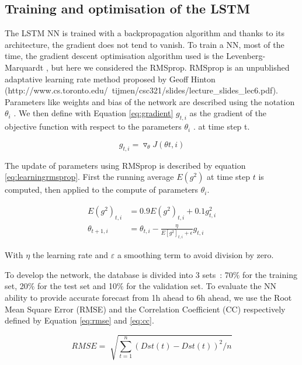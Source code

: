 \subsection{Training and optimisation of the LSTM}


The LSTM NN is trained with a backpropagation algorithm and thanks to its architecture, 
the gradient does not tend to vanish. To train a NN, most of the time, the gradient descent 
optimisation algorithm used is the Levenberg-Marquardt \citet{marquardt1963algorithm}, but here we 
considered the RMSprop. RMSprop is an unpublished adaptative learning rate method proposed by 
Geoff Hinton (http://www.cs.toronto.edu/~tijmen/csc321/slides/lecture\_slides\_lec6.pdf). 
Parameters like weights and bias of the network are described using the notation  \(  \theta _{i} \) . 
We then define with Equation \ref{eq:gradient}  \( g_{t,i} \)  as the gradient of the 
objective function with respect to the parameters \(   \theta _{i} \) . at time step t. 


\begin{equation}\label{eq:gradient}
 g_{t,i} = \triangledown_{ \theta } J \left(  \theta t,i \right)
\end{equation}

The update of parameters using RMSprop is described by equation \ref{eq:learningrmsprop}. First the running average  
\( E \left( g^{2} \right)  \)  at time step  \( t \)  is computed, then applied to the compute 
of parameters  \(  \theta _{i} \).


\begin{align}\label{eq:learningrmsprop}
 E \left( g^{2} \right)_{t,i} &= 0.9E \left( g^{2} \right)_{t,i} + 0.1 g_{t,i}^{2}  \\ 
 \theta _{t+1,i} &= \theta _{t,i} - \frac{ \eta }{E \left[ g^{2} \right]_{t,i}+ \epsilon } g_{t,i}
\end{align}

With  \(  \eta   \) the learning rate and  \(  \varepsilon  \)  a smoothing term to avoid division by zero.

To develop the network, the database is divided into 3 sets : 70$\%$  for the training set, 20$\%$  
for the test set and 10$\%$  for the validation set. To evaluate the NN ability to provide accurate 
forecast from 1h ahead to 6h ahead, we use the Root Mean Square Error (RMSE) and the Correlation Coefficient (CC) 
respectively defined by Equation \ref{eq:rmse} and \ref{eq:cc}. 


\begin{equation}\label{eq:rmse}
 RMSE= \sqrt[]{ \sum _{t=1}^{n} \left( Dst \left( t \right) -Dst \left( t \right)  \right) ^{2}/n}
\end{equation}

